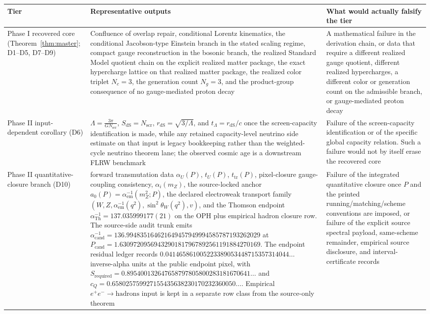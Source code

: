 \documentclass[11pt]{article}
\begin{document}
\begingroup
\footnotesize
\begin{longtable}{@{}>{\raggedright\arraybackslash}p{}>{\raggedright\arraybackslash}p{}>{\raggedright\arraybackslash}p{}@{}}
\toprule
Tier & Representative outputs & What would actually falsify the tier \\
\midrule
\endhead
\bottomrule
\endfoot
Phase I recovered core (Theorem~\ref{thm:master}; D1--D5, D7--D9) & Confluence of overlap repair, conditional Lorentz kinematics, the conditional Jacobson-type Einstein branch in the stated scaling regime, compact gauge reconstruction in the bosonic branch, the realized Standard Model quotient chain on the explicit realized matter package, the exact hypercharge lattice on that realized matter package, the realized color triplet \(N_c=3\), the generation count \(N_g=3\), and the product-group consequence of no gauge-mediated proton decay & A mathematical failure in the derivation chain, or data that require a different realized gauge quotient, different realized hypercharges, a different color or generation count on the admissible branch, or gauge-mediated proton decay \\
Phase II input-dependent corollary (D6) & \(\Lambda=\frac{3\pi}{G N_{\mathrm{scr}}}\), \(S_{\mathrm{dS}}=N_{\mathrm{scr}}\), \(r_{\mathrm{dS}}=\sqrt{3/\Lambda}\), and \(t_\Lambda=r_{\mathrm{dS}}/c\) once the screen-capacity identification is made, while any retained capacity-level neutrino side estimate on that input is legacy bookkeeping rather than the weighted-cycle neutrino theorem lane; the observed cosmic age is a downstream FLRW benchmark & Failure of the screen-capacity identification or of the specific global capacity relation. Such a failure would not by itself erase the recovered core \\
Phase II quantitative-closure branch (D10) & forward transmutation data \(\alpha_U(P)\), \(t_U(P)\), \(t_{\mathrm{tr}}(P)\), pixel-closure gauge-coupling consistency, \(\alpha_i(m_Z)\), the source-locked anchor \(a_0(P)=\alpha_{\mathrm{em}}^{-1}(m_Z^2;P)\), the declared electroweak transport family \((W,Z,\alpha_{\mathrm{em}}^{-1}(q^2),\sin^2\theta_W(q^2),v)\), and the Thomson endpoint \(\alpha_{\mathrm{Th}}^{-1}=137.035999177(21)\) on the OPH plus empirical hadron closure row. The source-side audit trunk emits \(\alpha_{\mathrm{cand}}^{-1}=136.994835164621649457949994585787193262029\) at \(P_{\mathrm{cand}}=1.63097209569432901817967892561191884270169\). The endpoint residual ledger records \(0.041465861005223389053448715357314044\ldots\) inverse-alpha units at the public endpoint pixel, with \(S_{\mathrm{required}}=0.895400132647658797805800283181670641\ldots\) and \(c_Q=0.658025759927155435638230170232360050\ldots\). Empirical \(e^+e^-\to\mathrm{hadrons}\) input is kept in a separate row class from the source-only theorem & Failure of the integrated quantitative closure once \(P\) and the printed running/matching/scheme conventions are imposed, or failure of the explicit source spectral payload, same-scheme remainder, empirical source disclosure, and interval-certificate records \\

\end{longtable}
\end{document}
